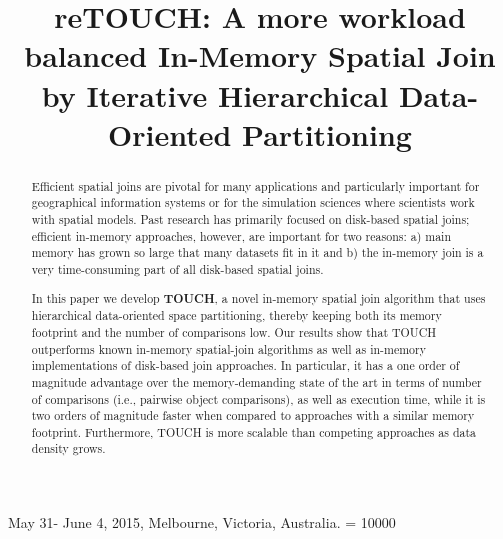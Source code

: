 \documentclass{vldb}
\newcommand{\hide}[1]{}
\begin{document}
 {May 31- June 4, 2015, Melbourne, Victoria, Australia.}
\widowpenalty = 10000

\title{reTOUCH: A more workload balanced In-Memory Spatial Join by Iterative Hierarchical Data-Oriented Partitioning}

\hide{
\numberofauthors{3}
\author{
\alignauthor Sadegh Nobari$^\P$$^\dag$
\alignauthor Farhan Tauheed$^\dag$$^\ddag$
\alignauthor Thomas Heinis$^\dag$
\and
\alignauthor Panagiotis Karras$^\S$
\alignauthor St\'{e}phane Bressan$^\P$
\alignauthor Anastasia Ailamaki$^\dag$
\and\affaddr{$^\P$National University of Singapore, Singapore}
\and\affaddr{$^\dag$Data-Intensive Applications and Systems Lab, \'{E}cole Polytechnique F\'{e}d\'{e}rale de Lausanne, Switzerland}
\and\affaddr{$^\ddag$Brain Mind Institute, \'{E}cole Polytechnique F\'{e}d\'{e}rale de Lausanne, Switzerland}
\and\affaddr{$^\S$Department of Management Science and Information Systems, Rutgers University, USA}
}
}

\maketitle

\begin{abstract}
Efficient spatial joins are pivotal for many applications and particularly important for geographical information systems or for the simulation sciences
where scientists work with spatial models. Past research has primarily focused on disk-based spatial joins; efficient in-memory approaches, however,
are important for two reasons: a) main memory has grown so large that many datasets fit in it and b) the in-memory join is a very time-consuming part
of all disk-based spatial joins.

In this paper we develop \textbf{TOUCH}, a novel in-memory spatial join algorithm that uses hierarchical data-oriented space partitioning, thereby keeping both
its memory footprint and the number of comparisons low. Our results show that TOUCH outperforms known in-memory spatial-join algorithms as well as in-memory
implementations of disk-based join approaches. In particular, it has a one order of magnitude advantage over the memory-demanding state of the art in terms of
number of comparisons (i.e., pairwise object comparisons), as well as execution time, while it is two orders of magnitude faster when compared to approaches
with a similar memory footprint. Furthermore, TOUCH is more scalable than competing approaches as data density grows.
\end{abstract}
\end{document}
